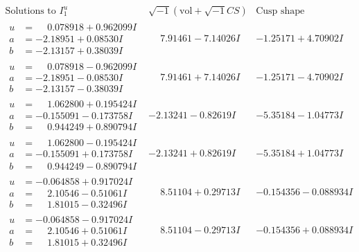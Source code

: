 \documentclass[1p]{elsarticle_modified}
\theoremstyle{definition}
\newcommand{\I}{\sqrt{-1}}
\begin{document}
$$\begin{array}{c|c|c}  
\text{Solutions to }I^u_{1}& \I (\text{vol} + \sqrt{-1}CS) & \text{Cusp shape}\\
 \hline 
\begin{aligned}
u &= \phantom{-}0.078918 + 0.962099 I \\
a &= -2.18951 + 0.08530 I \\
b &= -2.13157 + 0.38039 I\end{aligned}
 & \phantom{-}7.91461 - 7.14026 I & -1.25171 + 4.70902 I \\ \hline\begin{aligned}
u &= \phantom{-}0.078918 - 0.962099 I \\
a &= -2.18951 - 0.08530 I \\
b &= -2.13157 - 0.38039 I\end{aligned}
 & \phantom{-}7.91461 + 7.14026 I & -1.25171 - 4.70902 I \\ \hline\begin{aligned}
u &= \phantom{-}1.062800 + 0.195424 I \\
a &= -0.155091 - 0.173758 I \\
b &= \phantom{-}0.944249 + 0.890794 I\end{aligned}
 & -2.13241 - 0.82619 I & -5.35184 - 1.04773 I \\ \hline\begin{aligned}
u &= \phantom{-}1.062800 - 0.195424 I \\
a &= -0.155091 + 0.173758 I \\
b &= \phantom{-}0.944249 - 0.890794 I\end{aligned}
 & -2.13241 + 0.82619 I & -5.35184 + 1.04773 I \\ \hline\begin{aligned}
u &= -0.064858 + 0.917024 I \\
a &= \phantom{-}2.10546 - 0.51061 I \\
b &= \phantom{-}1.81015 - 0.32496 I\end{aligned}
 & \phantom{-}8.51104 + 0.29713 I & -0.154356 - 0.088934 I \\ \hline\begin{aligned}
u &= -0.064858 - 0.917024 I \\
a &= \phantom{-}2.10546 + 0.51061 I \\
b &= \phantom{-}1.81015 + 0.32496 I\end{aligned}
 & \phantom{-}8.51104 - 0.29713 I & -0.154356 + 0.088934 I \\ \hline\begin{aligned}

\end{aligned}
\end{array}$$
\end{document}

